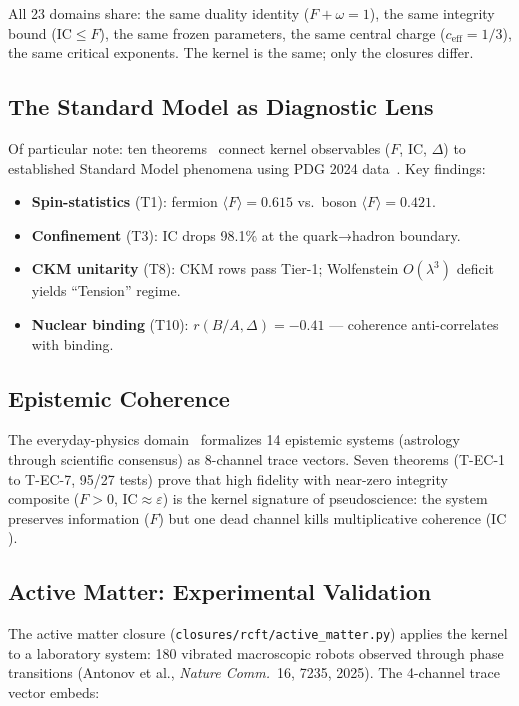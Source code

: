 \documentclass[
  aps,
  prd,
  preprint,
  superscriptaddress,
  nofootinbib,
  floatfix,
  longbibliography
]{revtex4-2}
\newcommand{\eps}{\varepsilon}
\newcommand{\IC}{\mathrm{IC}}
\newcommand{\Fid}{F}
\newcommand{\Drft}{\omega}
\newcommand{\ceff}{c_{\mathrm{eff}}}
\newcommand{\hetgap}{\Delta}
\begin{document}
All 23 domains share:
the same duality identity ($\Fid + \Drft = 1$),
the same integrity bound ($\IC \leq \Fid$),
the same frozen parameters,
the same central charge ($\ceff = 1/3$),
the same critical exponents.
The kernel is the same; only the closures differ.

\subsection{The Standard Model as Diagnostic Lens}

Of particular note:
ten theorems~\cite{paulus2026sm} connect
kernel observables ($\Fid$, $\IC$, $\hetgap$) to established
Standard Model phenomena using
PDG 2024 data~\cite{pdg2024}.
Key findings:

\begin{itemize}[nosep,leftmargin=*]
  \item \textbf{Spin-statistics} (T1): fermion $\langle\Fid\rangle = 0.615$ vs.\
    boson $\langle\Fid\rangle = 0.421$.
  \item \textbf{Confinement} (T3): $\IC$ drops 98.1\% at the
    quark→hadron boundary.
  \item \textbf{CKM unitarity} (T8): CKM rows pass Tier-1;
    Wolfenstein $O(\lambda^3)$ deficit yields ``Tension'' regime.
  \item \textbf{Nuclear binding} (T10):
    $r(B/A, \hetgap) = -0.41$ — coherence anti-correlates
    with binding.
\end{itemize}

\subsection{Epistemic Coherence}

The everyday-physics domain~\cite{paulus2025episteme}
formalizes 14 epistemic systems
(astrology through scientific consensus) as 8-channel
trace vectors.
Seven theorems (T-EC-1 to T-EC-7, 95/27 tests) prove that
high fidelity with near-zero integrity composite
($\Fid > 0$, $\IC \approx \eps$) is the kernel signature of
pseudoscience: the system preserves information ($\Fid$)
but one dead channel kills multiplicative coherence ($\IC$).

\subsection{Active Matter: Experimental Validation}

The active matter closure (\texttt{closures/rcft/active\_matter.py})
applies the kernel to a laboratory system:
180 vibrated macroscopic robots observed through
phase transitions (Antonov et al., \textit{Nature Comm.}\
16, 7235, 2025).
The 4-channel trace vector embeds:
\end{document}
